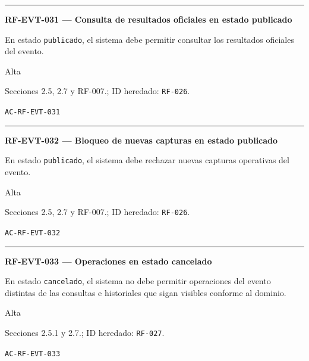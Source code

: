 \documentclass[10pt,letterpaper]{article}
\begin{document}
\vspace{0.25em}\hrule\vspace{0.65em}
\noindent\textbf{RF-EVT-031 --- Consulta de resultados oficiales en estado publicado}\par
\begin{description}[style=nextline,leftmargin=3.15cm,labelwidth=2.8cm,font=\normalfont\bfseries]
\item[Obligación] En estado \texttt{publicado}, el sistema debe permitir consultar los resultados oficiales del evento.
\item[Prioridad] Alta
\item[Procedencia] Secciones 2.5, 2.7 y RF-007.; ID heredado: \texttt{RF-026}.
\item[Verificación] \texttt{AC-RF-EVT-031}
\end{description}
\vspace{0.25em}\hrule\vspace{0.65em}
\noindent\textbf{RF-EVT-032 --- Bloqueo de nuevas capturas en estado publicado}\par
\begin{description}[style=nextline,leftmargin=3.15cm,labelwidth=2.8cm,font=\normalfont\bfseries]
\item[Obligación] En estado \texttt{publicado}, el sistema debe rechazar nuevas capturas operativas del evento.
\item[Prioridad] Alta
\item[Procedencia] Secciones 2.5, 2.7 y RF-007.; ID heredado: \texttt{RF-026}.
\item[Verificación] \texttt{AC-RF-EVT-032}
\end{description}
\vspace{0.25em}\hrule\vspace{0.65em}
\noindent\textbf{RF-EVT-033 --- Operaciones en estado cancelado}\par
\begin{description}[style=nextline,leftmargin=3.15cm,labelwidth=2.8cm,font=\normalfont\bfseries]
\item[Obligación] En estado \texttt{cancelado}, el sistema no debe permitir operaciones del evento distintas de las consultas e historiales que sigan visibles conforme al dominio.
\item[Prioridad] Alta
\item[Procedencia] Secciones 2.5.1 y 2.7.; ID heredado: \texttt{RF-027}.
\item[Verificación] \texttt{AC-RF-EVT-033}
\end{description}
\end{document}
